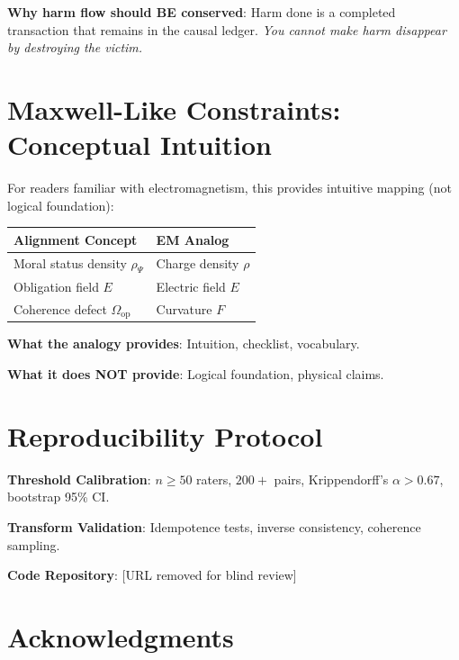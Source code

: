 \documentclass[12pt]{article}
\begin{document}
\textbf{Why harm flow should BE conserved}: Harm done is a completed transaction that remains in the causal ledger. \emph{You cannot make harm disappear by destroying the victim.}

\section{Maxwell-Like Constraints: Conceptual Intuition}

For readers familiar with electromagnetism, this provides intuitive mapping (not logical foundation):

\begin{table}[ht]
\centering
\begin{tabular}{@{}ll@{}}
\toprule
\textbf{Alignment Concept} & \textbf{EM Analog} \\
\midrule
Moral status density $\rho_\Psi$ & Charge density $\rho$ \\
Obligation field $E$ & Electric field $E$ \\
Coherence defect $\Omega_{\mathrm{op}}$ & Curvature $F$ \\
\bottomrule
\end{tabular}
\end{table}

\textbf{What the analogy provides}: Intuition, checklist, vocabulary.

\textbf{What it does NOT provide}: Logical foundation, physical claims.

\section{Reproducibility Protocol}

\textbf{Threshold Calibration}: $n \geq 50$ raters, $200+$ pairs, Krippendorff's $\alpha > 0.67$, bootstrap 95\% CI.

\textbf{Transform Validation}: Idempotence tests, inverse consistency, coherence sampling.

\textbf{Code Repository}: [URL removed for blind review]

\section*{Acknowledgments}
\end{document}
